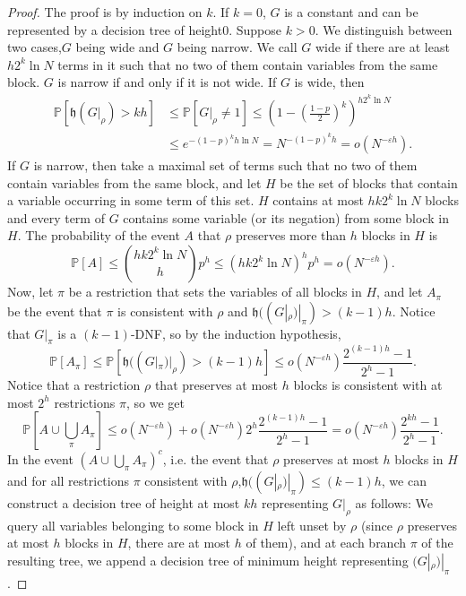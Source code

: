 \documentclass[10pt,a4paper]{article}
\newcommand{\height}{\mathfrak h}
\begin{document}
\begin{proof}
The proof is by induction on $k$. If $k=0$, $G$ is a constant and can be represented by a decision tree of height0. Suppose $k>0$. We distinguish between two cases,$G$ being wide and $G$ being narrow. We call $G$ wide if there are at least $h2^k\ln N$ terms in it such that no two of them contain variables from the same block. $G$ is narrow if and only if it is not wide. If $G$ is wide, then
\begin{align*}
\mathbb P[\height(G|_\rho)>kh]&\le\mathbb P[G|_\rho\ne1]\le\left(1-\left(\frac{1-p}{2}\right)^k\right)^{h2^k\ln N}\\
&\le e^{-(1-p)^k h\ln N}=N^{-(1-p)^kh}=o(N^{-\varepsilon h}).
\end{align*}
If $G$ is narrow, then take a maximal set of terms such that no two of them contain variables from the same block, and let $H$ be the set of blocks that contain a variable occurring in some term of this set. $H$ contains at most $hk2^k\ln N$ blocks and every term of $G$ contains some variable (or its negation) from some block in $H$. The probability of the event $A$ that $\rho$ preserves more than $h$ blocks in $H$ is
\[\mathbb P[A]\le\binom{hk2^k\ln N}{h}p^h\le(hk2^k\ln N)^hp^h=o(N^{-\varepsilon h}).\]
Now, let $\pi$ be a restriction that sets the variables of all blocks in $H$, and let $A_\pi$ be the event that $\pi$ is consistent with $\rho$ and $\height((G|_\rho)|_\pi)>(k-1)h$. Notice that $G|_\pi$ is a $(k-1)$-DNF, so by the induction hypothesis,
\[\mathbb P[A_\pi]\le\mathbb P[\height((G|_\pi)|_\rho)>(k-1)h]\le o(N^{-\varepsilon h})\frac{2^{(k-1)h}-1}{2^h-1}.\]
Notice that a restriction $\rho$ that preserves at most $h$ blocks is consistent with at most $2^h$ restrictions $\pi$, so we get
\[\mathbb P\left[A\cup\bigcup_\pi A_\pi\right]\le o(N^{-\varepsilon h})+o(N^{-\varepsilon h})2^h\frac{2^{(k-1)h}-1}{2^h-1}=o(N^{-\varepsilon h})\frac{2^{kh}-1}{2^h-1}.\]
In the event $\left(A\cup\bigcup_\pi A_\pi\right)^c$, i.e. the event that $\rho$ preserves at most $h$ blocks in $H$ and for all restrictions $\pi$ consistent with $\rho$,$\height((G|_\rho)|_\pi)\le(k-1)h$, we can construct a decision tree of height at most $kh$ representing $G|_\rho$ as follows: We query all variables belonging to some block in $H$ left unset by $\rho$ (since $\rho$ preserves at most $h$ blocks in $H$, there are at most $h$ of them), and at each branch $\pi$ of the resulting tree, we append a decision tree of minimum height representing $(G|_\rho)|_\pi$.
\end{proof}
\end{document}
